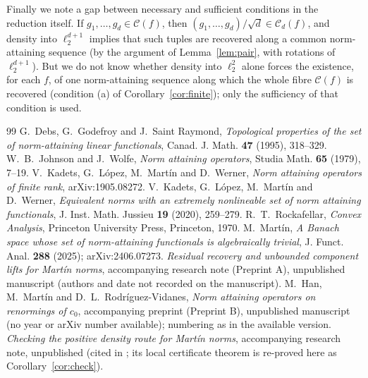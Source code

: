 \documentclass[10pt]{amsart}
\theoremstyle{definition}
\theoremstyle{remark}
\newcommand{\Cset}{\mathcal C}
\begin{document}
Finally we note a gap between necessary and sufficient conditions in the
reduction itself.  If $g_1,\dots,g_d\in\Cset(f)$, then
$(g_1,\dots,g_d)/\sqrt d\in\Cset_d(f)$, and density into $\ell_2^{d+1}$
implies that such tuples are recovered along a common norm-attaining
sequence (by the argument of Lemma~\ref{lem:pair}, with rotations of
$\ell_2^{d+1}$).  But we do not
know whether density into $\ell_2^2$ alone forces the existence, for each
$f$, of one norm-attaining sequence along which the whole fibre $\Cset(f)$ is
recovered (condition (a) of Corollary~\ref{cor:finite}); only the
sufficiency of that condition is used.

\begin{thebibliography}{99}
G.~Debs, G.~Godefroy and J.~Saint Raymond,
\emph{Topological properties of the set of norm-attaining linear
functionals}, Canad. J. Math. \textbf{47} (1995), 318--329.
W.~B.~Johnson and J.~Wolfe, \emph{Norm attaining operators},
Studia Math. \textbf{65} (1979), 7--19.
V.~Kadets, G.~L\'opez, M.~Mart\'in and D.~Werner,
\emph{Norm attaining operators of finite rank}, arXiv:1905.08272.
V.~Kadets, G.~L\'opez, M.~Mart\'in and D.~Werner,
\emph{Equivalent norms with an extremely nonlineable set of norm attaining
functionals}, J. Inst. Math. Jussieu \textbf{19} (2020), 259--279.
R.~T.~Rockafellar, \emph{Convex Analysis}, Princeton University Press,
Princeton, 1970.
M.~Mart\'in,
\emph{A Banach space whose set of norm-attaining functionals is
algebraically trivial}, J. Funct. Anal. \textbf{288} (2025);
arXiv:2406.07273.
\emph{Residual recovery and unbounded component lifts for Mart\'in norms},
accompanying research note (Preprint A), unpublished manuscript (authors
and date not recorded on the manuscript).
M.~Han, M.~Mart\'in and D.~L.~Rodr\'iguez-Vidanes,
\emph{Norm attaining operators on renormings of $c_0$}, accompanying
preprint (Preprint B), unpublished manuscript (no year or arXiv number
available); numbering as in the available version.
\emph{Checking the positive density route for Mart\'in norms},
accompanying research note, unpublished (cited in \cite{PrA}; its local
certificate theorem is re-proved here as Corollary~\ref{cor:check}).
\end{thebibliography}
\end{document}
